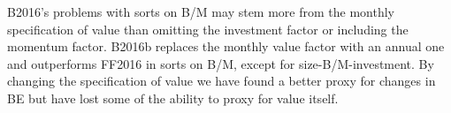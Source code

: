 B2016's problems with sorts on B/M may stem more from the monthly specification of value
than omitting the investment factor or including the momentum factor. B2016b replaces the
monthly value factor with an annual one and outperforms FF2016 in sorts on B/M, except for
size-B/M-investment. By changing the specification of value we have found a better proxy
for changes in BE but have lost some of the ability to proxy for value itself.
